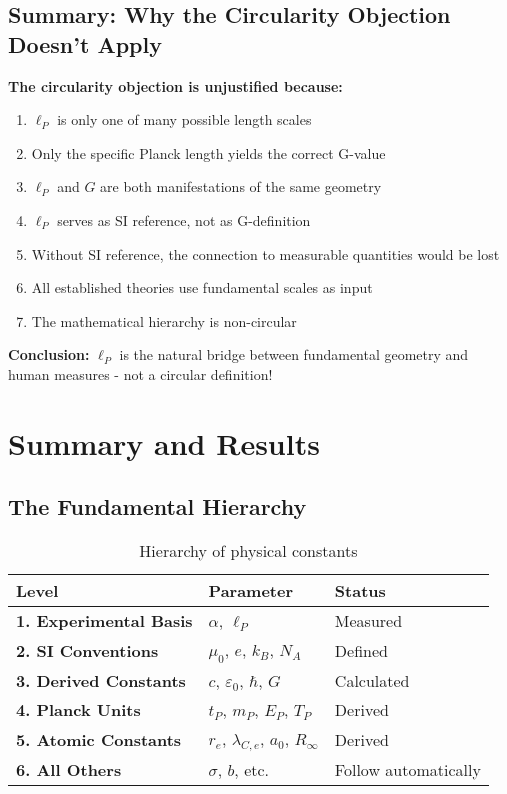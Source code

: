 \documentclass[12pt,a4paper]{article}
\theoremstyle{definition}
\begin{document}
	\subsection{Summary: Why the Circularity Objection Doesn't Apply}
	
	\begin{tcolorbox}[colback=yellow!10!white,colframe=orange!75!black,title=Final Refutation]
		\textbf{The circularity objection is unjustified because:}
		
		\begin{enumerate}
			\item $\ell_P$ is only one of many possible length scales
			\item Only the specific Planck length yields the correct G-value  
			\item $\ell_P$ and $G$ are both manifestations of the same geometry
			\item $\ell_P$ serves as SI reference, not as G-definition
			\item Without SI reference, the connection to measurable quantities would be lost
			\item All established theories use fundamental scales as input
			\item The mathematical hierarchy is non-circular
		\end{enumerate}
		
		\textbf{Conclusion:} $\ell_P$ is the natural bridge between fundamental geometry and human measures - not a circular definition!
	\end{tcolorbox}
	
	\section{Summary and Results}
	
	\subsection{The Fundamental Hierarchy}
	
	\begin{table}[h]
		\centering
		\begin{tabular}{|l|l|l|}
			\hline
			\textbf{Level} & \textbf{Parameter} & \textbf{Status} \\
			\hline
			\textbf{1. Experimental Basis} & $\alpha$, $\ell_P$ & Measured \\
			\textbf{2. SI Conventions} & $\mu_0$, $e$, $k_B$, $N_A$ & Defined \\
			\textbf{3. Derived Constants} & $c$, $\varepsilon_0$, $\hbar$, $G$ & Calculated \\
			\textbf{4. Planck Units} & $t_P$, $m_P$, $E_P$, $T_P$ & Derived \\
			\textbf{5. Atomic Constants} & $r_e$, $\lambda_{C,e}$, $a_0$, $R_\infty$ & Derived \\
			\textbf{6. All Others} & $\sigma$, $b$, etc. & Follow automatically \\
			\hline
		\end{tabular}
		\caption{Hierarchy of physical constants}
	\end{table}
	
\end{document}
